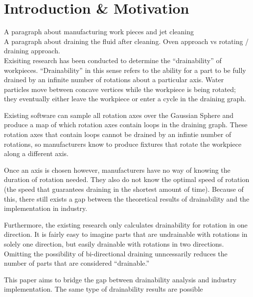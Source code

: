 							\chapter{Introduction \& Motivation}

A paragraph about manufacturing work pieces and jet cleaning
\\

A paragraph about draining the fluid after cleaning. Oven approach vs rotating / draining approach.
\\

Exisiting research \cite{plot} has been conducted to determine the ``drainability'' of workpieces. ``Drainability'' in this sense refers to the ability for a part to be fully drained by an infinite number of rotations about a particular axis. Water particles move between concave vertices while the workpiece is being rotated; they eventually either leave the workpiece or enter a cycle in the draining graph.

Existing software can sample all rotation axes over the Gaussian Sphere and produce a map of which rotation axes contain loops in the draining graph. These rotation axes that contain loops cannot be drained by an infintie number of rotations, so manufacturers know to produce fixtures that rotate the workpiece along a different axis.

Once an axis is chosen however, manufacturers have no way of knowing the duration of rotation needed. They also do not know the optimal speed of rotation (the speed that guarantees draining in the shortest amount of time). Because of this, there still exists a gap between the theoretical results of drainability and the implementation in industry.

Furthermore, the existing research only calculates drainability for rotation in one direction. It is fairly easy to imagine parts that are undrainable with rotations in solely one direction, but easily drainable with rotations in two directions. Omitting the possibility of bi-directional draining unncessarily reduces the number of parts that are considered ``drainable.''

This paper aims to bridge the gap between drainability analysis and industry implementation. The same type of drainability results are possible
